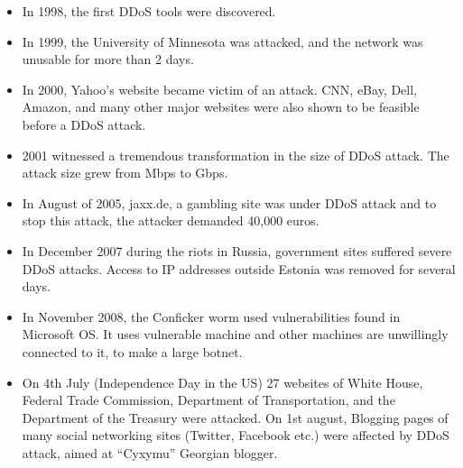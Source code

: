 \documentclass[twocolumn]{article}
\begin{document}
\begin{itemize}
    \item In 1998, the first DDoS tools were discovered.
    \item In 1999, the University of Minnesota was attacked, and the network was unusable for more than 2 days.
    \item In 2000, Yahoo’s website became victim of an attack.  CNN, eBay, Dell, Amazon, and many other major websites were also shown to be feasible before a DDoS attack.
    \item 2001 witnessed a tremendous transformation in the size of DDoS attack. The attack size grew from Mbps to Gbps.
    \item In August of 2005, jaxx.de, a gambling site was under DDoS attack and to stop this attack, the attacker demanded 40,000 euros.
    \item In December 2007 during the riots in Russia, government sites suffered severe DDoS attacks. Access to IP addresses outside Estonia was removed for several days.
    \item In November 2008, the Conficker worm used vulnerabilities found in Microsoft OS. It uses vulnerable machine and other machines are unwillingly connected to it, to make a large botnet.
    \item On 4th July (Independence Day in the US) 27 websites of White House, Federal Trade Commission, Department of Transportation, and the Department of the Treasury were attacked. On 1st august, Blogging pages of many social networking sites (Twitter, Facebook etc.) were affected by DDoS attack, aimed at “Cyxymu” Georgian blogger.
\end{itemize}
\end{document}
